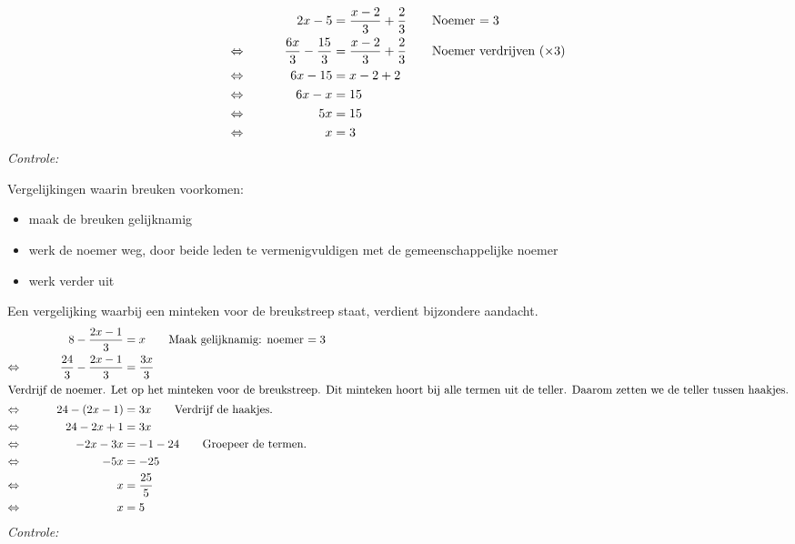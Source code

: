 \documentclass{bis}
\begin{document}
\begin{voorbeeld}
\begin{alignat*}{2}
     && 2x-5 &= \dfrac{x-2}{3} + \dfrac{2}{3} \qquad\text{Noemer $= 3$}\\
\Leftrightarrow\mkern40mu && \dfrac{6x}{3}-\dfrac{15}{3} &= \dfrac{x-2}{3} + \dfrac{2}{3} \qquad\text{Noemer verdrijven ($\times 3$)}\\
\Leftrightarrow\mkern40mu && 6x - 15	&= x - 2 + 2\\
\Leftrightarrow\mkern40mu && 6x - x	&= 15\\
\Leftrightarrow\mkern40mu && 5x	&= 15\\
\Leftrightarrow\mkern40mu && x	&= 3\\
\end{alignat*}
{\em Controle: }\\
\end{voorbeeld}

\begin{onthoud}
Vergelijkingen waarin breuken voorkomen:
\begin{itemize}
  \item maak de breuken gelijknamig
  \item werk de noemer weg, door beide leden te vermenigvuldigen met de gemeenschappelijke noemer
  \item werk verder uit
\end{itemize}
\end{onthoud}

\begin{voorbeeld}
Een vergelijking waarbij een minteken voor de breukstreep staat, verdient bijzondere aandacht.
\begin{alignat*}{2}
     && 8-\dfrac{2x-1}{3} &= x \qquad\text{Maak gelijknamig: noemer $= 3$}\\
\Leftrightarrow\mkern40mu && \dfrac{24}{3}-\dfrac{2x-1}{3} &= \dfrac{3x}{3}\\
\intertext{Verdrijf de noemer. Let op het minteken voor de breukstreep. Dit minteken hoort bij alle termen uit de teller. Daarom zetten we de teller tussen haakjes.}
\Leftrightarrow\mkern40mu && 24 - (2x - 1)	&= 3x	\qquad\text{Verdrijf de haakjes.}\\
\Leftrightarrow\mkern40mu && 24 - 2x + 1	&= 3x\\
\Leftrightarrow\mkern40mu && - 2x - 3x	&= - 1 - 24 \qquad\text{Groepeer de termen.}\\
\Leftrightarrow\mkern40mu && - 5x	&= - 25\\
\Leftrightarrow\mkern40mu && x	&= \dfrac{25}{5}\\ 
\Leftrightarrow\mkern40mu && x	&= 5\\
\end{alignat*}
{\em Controle: }\\
\end{voorbeeld}
\end{document}
